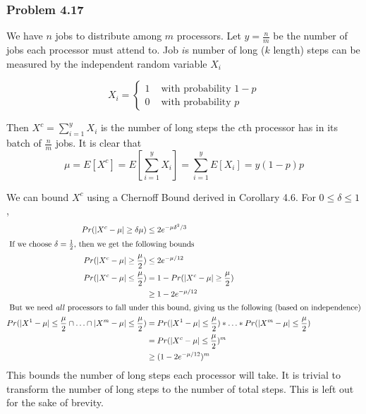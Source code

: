 \documentclass[12pt,letterpaper]{article}
\newenvironment{answer}[1]{
  \subsubsection*{Problem #1}
}{\newpage}
\begin{document}
\begin{answer}{4.17}
We have $n$ jobs to distribute among $m$ processors. Let $y = \frac{n}{m}$ be the number of jobs each processor must attend to. Job $i$s number of long ($k$ length) steps can be measured by the independent random variable $X_i$

$$ X_i = \begin{cases}
	1 &\mbox{ with probability $1-p$}\\
	0 &\mbox{ with probability $p$}
\end{cases}$$

Then $X^c = \sum_{i=1}^y X_i$ is the number of long steps the $c$th processor has in its batch of $\frac{n}{m}$ jobs. It is clear that
	$$ \mu = E[X^c] = E[\sum_{i=1}^y X_i] = \sum_{i=1}^y E[X_i] = y(1-p)p $$

We can bound $X^c$ using a Chernoff Bound derived in Corollary 4.6. For $0 \le \delta \le 1$,
\begin{align*}
	Pr(| X^c - \mu | \ge \delta \mu) &\le 2e^{-\mu \delta^2 / 3} \\
	\intertext{ If we choose $\delta = \frac{1}{2}$, then we get the following bounds}
	Pr(| X^c - \mu | \ge  \frac{\mu}{2}) &\le 2e^{-\mu / 12} \\
	Pr(| X^c - \mu | \le  \frac{\mu}{2}) &= 1 - Pr(| X^c - \mu | \ge  \frac{\mu}{2})\\
		&\ge 1 - 2e^{-\mu / 12} \\
	\intertext{ But we need \emph{all} processors to fall under this bound, giving us the following (based on independence)}
	Pr(| X^1 - \mu | \le  \frac{\mu}{2} \cap \ldots \cap | X^m - \mu | \le  \frac{\mu}{2}) &= Pr(| X^1 - \mu | \le  \frac{\mu}{2})*\ldots*Pr(| X^m - \mu | \le  \frac{\mu}{2})\\
			&= Pr( |X^c - \mu | \le  \frac{\mu}{2})^m\\
			 &\ge (1 - 2e^{-\mu / 12})^m \\
\end{align*}
This bounds the number of long steps each processor will take. It is trivial to transform the number of long steps to the number of total steps. This is left out for the sake of brevity.
\end{answer}
\end{document}
